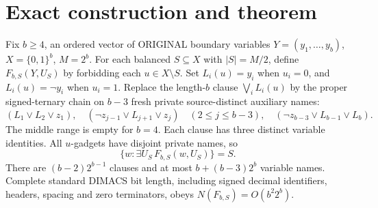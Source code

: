 \documentclass[11pt]{article}
\begin{document}
\section{Exact construction and theorem}
Fix $b\ge4$, an ordered vector of ORIGINAL
boundary variables $Y=(y_1,\ldots,y_b)$,
$X=\{0,1\}^b$, $M=2^b$.
For each balanced $S\subseteq X$ with $|S|=M/2$,
define $F_{b,S}(Y,U_S)$ by forbidding each
$u\in X\setminus S$. Set $L_i(u)=y_i$
when $u_i=0$, and $L_i(u)=\neg y_i$
when $u_i=1$. Replace the length-$b$
clause $\bigvee_i L_i(u)$ by the proper
signed-ternary chain on $b-3$ fresh private
source-distinct auxiliary names:
\[
(L_1\vee L_2\vee z_1),\quad
(\neg z_{j-1}\vee L_{j+1}\vee z_j)
 \quad(2\le j\le b-3),\quad
(\neg z_{b-3}\vee L_{b-1}\vee L_b).
\tag{1}
\]
The middle range is empty for $b=4$.
Each clause has three distinct variable identities.
All $u$-gadgets have disjoint private names, so
\[
 \{w:\exists U_S\,F_{b,S}(w,U_S)\}=S.            \tag{2}
\]
There are $(b-2)2^{b-1}$ clauses and at most
$b+(b-3)2^b$ variable names. Complete standard
DIMACS bit length, including signed decimal identifiers,
headers, spacing and zero terminators, obeys
$N(F_{b,S})=O(b^2 2^b)$.
\end{document}
